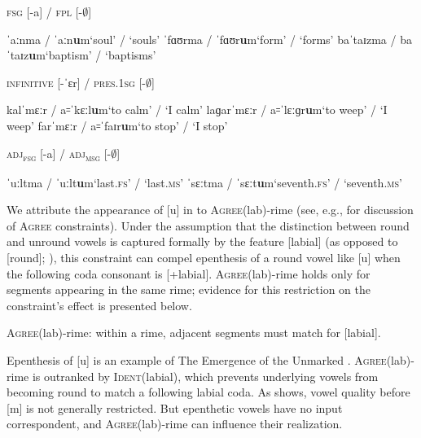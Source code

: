 \documentclass[output=paper,colorlinks,citecolor=brown]{langscibook}
\begin{document}
\begin{exe}
    \ex \label{epenthesism}
    \begin{xlist}
        \ex \textsc{fsg} [-a] / \textsc{fpl} [-$\emptyset$]
            \begin{xlisti}
                \ex ˈaːnma / ˈaːn\textbf{u}m\tab `soul' / `souls'
                \ex ˈfɑʊrma / ˈfɑʊr\textbf{u}m\tab `form' / `forms'
                \ex baˈtaɪzma / baˈtaɪz\textbf{u}m\tab `baptism' / `baptisms'
            \end{xlisti}
        \ex \textsc{infinitive} [-ˈɛr] / \textsc{pres.1sg} [-$\emptyset$]
            \begin{xlisti}
                \ex kalˈmɛːr / a꞊ˈkɛːl\textbf{u}m\tab `to calm' / `I calm'
                \ex laɡarˈmɛːr / a꞊ˈlɛːɡr\textbf{u}m\tab `to weep'  / `I weep'
                \ex farˈmɛːr / a꞊ˈfaɪr\textbf{u}m\tab `to stop' / `I stop'
            \end{xlisti}
        \ex \textsc{adj\textsubscript{fsg}} [-a] / \textsc{adj\textsubscript{msg}} [-$\emptyset$]
            \begin{xlisti}
                \ex ˈuːltma / ˈuːlt\textbf{u}m\tab `last.\textsc{fs}' / `last.\textsc{ms}'
                \ex ˈsɛːtma / ˈsɛːt\textbf{u}m\tab `seventh.\textsc{fs}' / `seventh.\textsc{ms}'
            \end{xlisti}
    \end{xlist}
\end{exe}



We attribute the appearance of [u] in  to \textsc{Agree}(lab)-rime   (see, e.g., \cite{Lombardi:1999} for discussion of \textsc{Agree} constraints).  Under the assumption that the distinction between round and unround vowels is captured formally by the feature [labial] (as opposed to [round]; \citealt{Clements:1991}), this constraint can compel epenthesis of a round vowel like [u] when the following coda consonant is [+labial].  \textsc{Agree}(lab)-rime holds only for segments appearing in the same rime; evidence for this restriction on the constraint's effect is presented below.


\ea
\label{agreedef} 
\textsc{Agree}(lab)-rime: within a rime, adjacent segments must match for [labial].
\z


Epenthesis of [u] is an example of The Emergence of the Unmarked \citep{mccarthy:1994}.  \textsc{Agree}(lab)-rime is outranked by \textsc{Ident}(labial), which prevents underlying vowels from becoming round to match a following labial coda.  As  shows, vowel quality before [m] is not generally restricted.  But epenthetic vowels have no input correspondent, and \textsc{Agree}(lab)-rime can influence their realization.
\end{document}
